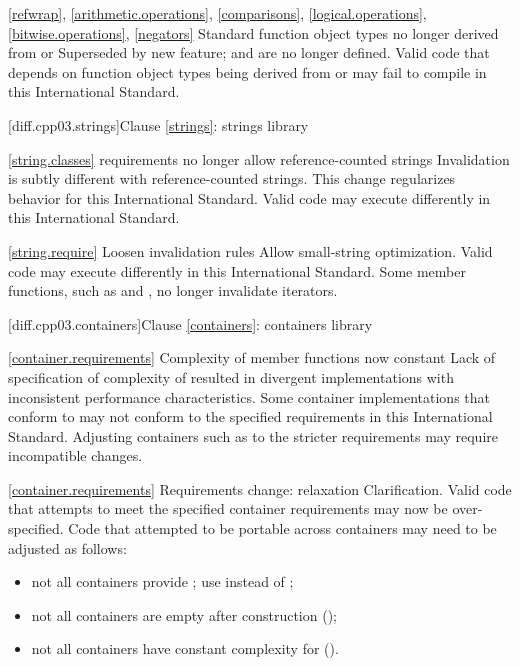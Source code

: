 \ref{refwrap}, \ref{arithmetic.operations}, \ref{comparisons},
\ref{logical.operations}, \ref{bitwise.operations}, \ref{negators}
\change Standard function object types no longer derived from
 or 
\rationale Superseded by new feature;  and
 are no longer defined.
\effect
Valid \CppIII code that depends on function object types being derived from
 or  may fail to compile
in this International Standard.

[diff.cpp03.strings]{Clause \ref{strings}: strings library}

\ref{string.classes}
\change {} requirements no longer allow reference-counted
strings
\rationale Invalidation is subtly different with reference-counted strings.
This change regularizes behavior for this International Standard.
\effect
Valid \CppIII code may execute differently in this International Standard.

\ref{string.require}
\change Loosen  invalidation rules
\rationale Allow small-string optimization.
\effect
Valid \CppIII code may execute differently in this International Standard.
Some  member functions, such as  and ,
no longer invalidate iterators.

[diff.cpp03.containers]{Clause \ref{containers}: containers library}

\ref{container.requirements}
\change Complexity of  member functions now constant
\rationale Lack of specification of complexity of  resulted in
divergent implementations with inconsistent performance characteristics.
\effect
Some container implementations that conform to \CppIII may not conform to the
specified  requirements in this International Standard. Adjusting
containers such as  to the stricter requirements may require
incompatible changes.

\ref{container.requirements}
\change Requirements change: relaxation
\rationale Clarification.
\effect
Valid \CppIII code that attempts to meet the specified container requirements
may now be over-specified. Code that attempted to be portable across containers
may need to be adjusted as follows:
\begin{itemize}
\item not all containers provide ; use  instead
of ;
\item not all containers are empty after construction ();
\item not all containers have constant complexity for  ().
\end{itemize}

